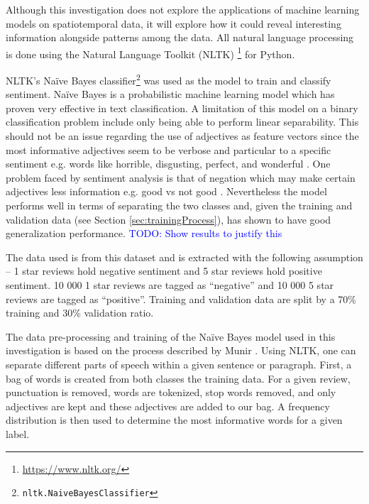Although this investigation does not explore the applications of machine learning models on spatiotemporal data, it will explore how it could reveal interesting information alongside patterns among the data. All natural language processing is done using the Natural Language Toolkit (NLTK)
\footnote{\url{https://www.nltk.org/}} for Python.

NLTK's Na\"ive Bayes classifier\footnote{\texttt{nltk.NaiveBayesClassifier}} was used as the model to train and classify sentiment. Na\"ive Bayes is a probabilistic machine learning model which has proven very effective in text classification. A limitation of this model on a binary classification problem include only being able to perform linear separability. This should not be an issue regarding the use of adjectives as feature vectors since the most informative adjectives seem to be verbose and particular to a specific sentiment e.g. words like horrible, disgusting, perfect, and wonderful \cite{rish2001empirical}. One problem faced by sentiment analysis is that of negation which may make certain adjectives less information e.g. good vs not good \cite{blanco2011some}. Nevertheless the model performs well in terms of separating the two classes and, given the training and validation data (see Section \ref{sec:trainingProcess}), has shown to have good generalization performance. \textcolor{blue}{TODO: Show results to justify this}

\label{sec:trainingProcess}

The data used is from this dataset and is extracted with the following assumption -- 1 star reviews hold negative sentiment and 5 star reviews hold positive sentiment. 10 000 1 star reviews are tagged as ``negative'' and 10 000 5 star reviews are tagged as ``positive''. Training and validation data are split by a 70\% training and 30\% validation ratio.

The data pre-processing and training of the Na\"ive Bayes model used in this investigation is based on the process described by Munir \cite{SamiraMunir}. Using NLTK, one can separate different parts of speech within a given sentence or paragraph. First, a bag of words is created from both classes
the training data. For a given review, punctuation is removed, words are tokenized, stop words removed, and only adjectives are kept and these adjectives are added to our bag. A frequency distribution is then used to determine the most informative words for a given label.

